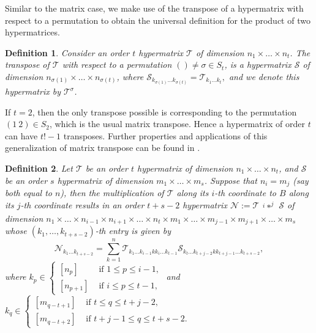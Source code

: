 \documentclass[10pt,a4paper]{article}
\newtheorem{definition}{Definition}[section]
\begin{document}
	Similar to the matrix case, we make use of the transpose of a hypermatrix with respect to a permutation to obtain the universal definition for the product of two hypermatrices. 
	
	\begin{definition}\cite{pan2014tensor}\label{hypermatrix_transpose}
		Consider an order $t$ hypermatrix $\mathcal{T}$ of dimension $n_1 \times \ldots \times n_t$. The transpose of $\mathcal{T}$ with respect to a permutation $() \neq \sigma \in S_t$, is a hypermatrix $\mathcal{S}$ of dimension  $n_{\sigma(1)} \times \ldots \times n_{\sigma(t)}$, where $\mathcal{S}_{k_{\sigma(1)} \ldots k_{\sigma(t)}} = \mathcal{T}_{k_{1}\ldots  k_{t}},$ and we denote this hypermatrix by $\mathcal{T}^{\sigma}$. 
	\end{definition}
	
	If $t=2$, then the only transpose possible is corresponding to the permutation $(1 ~ 2) \in S_2$, which is the usual matrix transpose. Hence a hypermatrix of order $t$ can have $t!-1$ transposes. Further properties and applications of this generalization of matrix transpose can be found in \cite{pan2014tensor}.
	
	\begin{definition}\label{product_star}
		Let $\mathcal{T}$ be an order $t$ hypermatrix of dimension $n_1 \times \ldots \times n_t$, and $\mathcal{S}$ be an order $s$ hypermatrix of dimension $m_1 \times \ldots \times m_s$. Suppose that $n_i = m_j$ (say both equal to $n$), then the multiplication of $\mathcal{T}$ along its $i$-th coordinate to $B$ along its $j$-th coordinate results in an order $t+s-2$ hypermatrix $\mathcal{N} := \mathcal{T} \substack{^i * ^j} \mathcal{S}$ of dimension $n_1 \times \ldots \times n_{i-1} \times n_{i+1} \times \ldots \times n_t \times m_1 \times \ldots \times m_{j-1} \times m_{j+1} \times \ldots \times m_s$ whose $(k_1, \ldots, k_{t+s-2})$-th entry is given by 
		\begin{equation*}
			\mathcal{N}_{k_1 \ldots k_{t+s-2}} = \sum\limits_{k=1}^n \mathcal{T}_{k_1 \ldots k_{i-1} k k_{i} \ldots k_{t-1}} \mathcal{S}_{k_{t} \ldots k_{t+j-2}k k_{t+j-1} \ldots k_{t+s-2}},
		\end{equation*}
		where 
		$k_p \in 
		\begin{cases} [n_p] & \text{ if } 
			1 \leq p \leq i-1,\\
			[n_{p+1}] & \text{ if }  i \leq p \leq t-1,
		\end{cases} $ 
		and 
		$k_q \in 
		\begin{cases} 
			[m_{q-t+1}] & \text{ if }  t \leq q \leq t+j-2,\\
			[m_{q-t+2}] & \text{ if } t+j-1 \leq q \leq t+s-2.
		\end{cases} $
	\end{definition}
	
\end{document}
